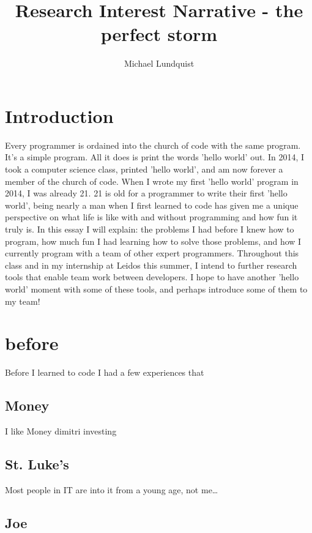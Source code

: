 \documentclass[titlepage]{article}
\author{Michael Lundquist}
\title{Research Interest Narrative - the perfect storm}
\begin{document}
\maketitle


\section{Introduction}

Every programmer is ordained into the church of code with the same program. It's a simple program. All it does is print the words 'hello world' out. In 2014, I took a computer science class, printed 'hello world', and am now forever a member of the church of code. When I wrote my first 'hello world' program in 2014, I was already 21. 21 is old for a programmer to write their first 'hello world', being nearly a man when I first learned to code has given me a unique perspective on what life is like with and without programming and how fun it truly is. In this essay I will explain: the problems I had before I knew how to program, how much fun I had learning how to solve those problems, and how I currently program with a team of other expert programmers. Throughout this class and in my internship at Leidos this summer, I intend to further research tools that enable team work between developers. I hope to have another 'hello world' moment with some of these tools, and perhaps introduce some of them to my team!

\section{before}

Before I learned to code I had a few experiences that 


\subsection{Money}

I like Money
dimitri
investing

\subsection{St. Luke's}

Most people in IT are into it from a young age, not me\dots


\subsection{Joe}
\end{document}
